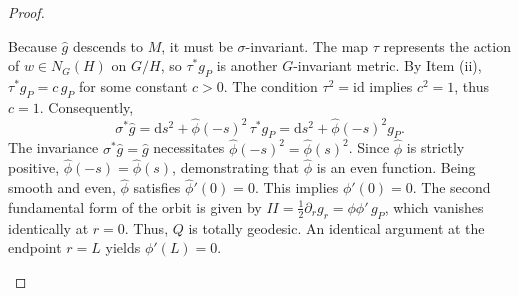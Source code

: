 \documentclass[12pt,a4paper]{amsart}
\theoremstyle{plain}
\theoremstyle{definition}
\theoremstyle{remark}
\newcommand{\ga}{\mathit{g}} %
\begin{document}
\begin{proof}
\begin{itemize}
    Because $\widehat{\ga}$ descends to $M$, it must be $\sigma$-invariant. The map $\tau$ represents the action of $w \in N_G(H)$ on $G/H$, so $\tau^\ast \ga_P$ is another $G$-invariant metric. By Item (ii), $\tau^\ast \ga_P = c\,\ga_P$ for some constant $c > 0$. The condition $\tau^2 = \mathrm{id}$ implies $c^2 = 1$, thus $c = 1$. Consequently,
    \[
    \sigma^\ast\widehat{\ga} = \mathrm{d}s^2 + \widehat{\phi}(-s)^2\,\tau^\ast \ga_P = \mathrm{d}s^2 + \widehat{\phi}(-s)^2 \ga_P.
    \]
    The invariance $\sigma^\ast\widehat{\ga} = \widehat{\ga}$ necessitates $\widehat{\phi}(-s)^2 = \widehat{\phi}(s)^2$. Since $\widehat{\phi}$ is strictly positive, $\widehat{\phi}(-s) = \widehat{\phi}(s)$, demonstrating that $\widehat{\phi}$ is an even function. Being smooth and even, $\widehat{\phi}$ satisfies $\widehat{\phi}'(0) = 0$. This implies $\phi'(0) = 0$. The second fundamental form of the orbit is given by $II = \frac{1}{2}\partial_r \ga_r = \phi\phi'\,\ga_P$, which vanishes identically at $r=0$. Thus, $Q$ is totally geodesic. An identical argument at the endpoint $r=L$ yields $\phi'(L) = 0$.
\end{itemize}
\end{proof}
\end{document}
